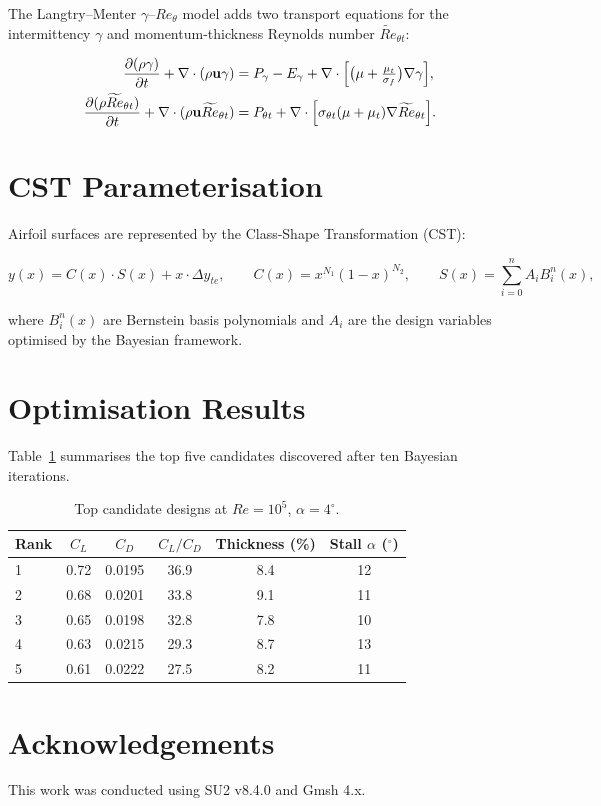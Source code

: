 \documentclass{article}
\begin{document}
The Langtry--Menter $\gamma$--$Re_\theta$ model adds two transport
equations for the intermittency $\gamma$ and momentum-thickness Reynolds
number $\widetilde{Re}_{\theta t}$:

\begin{align}
  \frac{\partial(\rho \gamma)}{\partial t}
    + \nabla \cdot (\rho \mathbf{u} \gamma)
    &= P_\gamma - E_\gamma
       + \nabla \cdot \Bigl[\bigl(\mu + \tfrac{\mu_t}{\sigma_f}\bigr)
         \nabla \gamma\Bigr], \\
  \frac{\partial(\rho \widetilde{Re}_{\theta t})}{\partial t}
    + \nabla \cdot (\rho \mathbf{u} \widetilde{Re}_{\theta t})
    &= P_{\theta t}
       + \nabla \cdot \Bigl[
         \sigma_{\theta t}(\mu + \mu_t)\nabla\widetilde{Re}_{\theta t}
         \Bigr].
\end{align}

\section{CST Parameterisation}

Airfoil surfaces are represented by the Class-Shape Transformation (CST):

\begin{equation}
  y(x) = C(x) \cdot S(x) + x \cdot \Delta y_{te},
  \qquad
  C(x) = x^{N_1}(1-x)^{N_2},
  \qquad
  S(x) = \sum_{i=0}^{n} A_i B_i^n(x),
\end{equation}

where $B_i^n(x)$ are Bernstein basis polynomials and $A_i$ are the design
variables optimised by the Bayesian framework.

\section{Optimisation Results}

Table~\ref{tab:results} summarises the top five candidates discovered
after ten Bayesian iterations.

\begin{table}[h!]
  \centering
  \caption{Top candidate designs at $Re = 10^5$, $\alpha = 4^\circ$.}
  \label{tab:results}
  \begin{tabular}{lccccc}
    \toprule
    Rank & $C_L$ & $C_D$ & $C_L/C_D$ & Thickness (\%) & Stall $\alpha$ ($^\circ$) \\
    \midrule
    1 & 0.72 & 0.0195 & 36.9 & 8.4 & 12 \\
    2 & 0.68 & 0.0201 & 33.8 & 9.1 & 11 \\
    3 & 0.65 & 0.0198 & 32.8 & 7.8 & 10 \\
    4 & 0.63 & 0.0215 & 29.3 & 8.7 & 13 \\
    5 & 0.61 & 0.0222 & 27.5 & 8.2 & 11 \\
    \bottomrule
  \end{tabular}
\end{table}

\section*{Acknowledgements}
This work was conducted using SU2 v8.4.0 and Gmsh 4.x.
\end{document}
